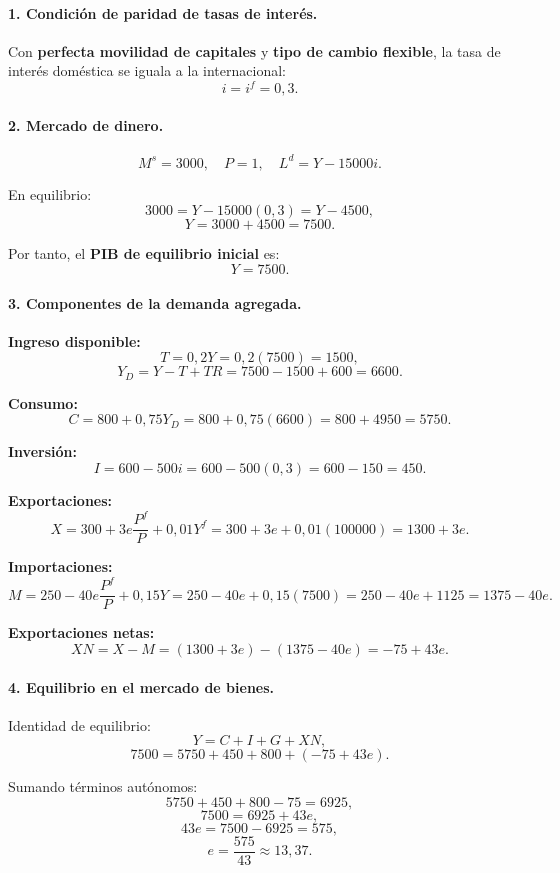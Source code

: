 \documentclass[11pt,addpoints]{article}
\begin{document}
\paragraph{1. Condición de paridad de tasas de interés.}

Con \textbf{perfecta movilidad de capitales} y \textbf{tipo de cambio flexible}, la tasa de interés doméstica se iguala a la internacional:
\[
i = i^f = 0{,}3.
\]

\paragraph{2. Mercado de dinero.}

\[
M^s = 3000, \quad P=1, \quad L^d = Y - 15000i.
\]

En equilibrio:
\[
3000 = Y - 15000(0{,}3) = Y - 4500,
\]
\[
Y = 3000 + 4500 = 7500.
\]

Por tanto, el \textbf{PIB de equilibrio inicial} es:
\[
\boxed{Y = 7500.}
\]

\paragraph{3. Componentes de la demanda agregada.}

\textbf{Ingreso disponible:}
\[
T = 0{,}2Y = 0{,}2(7500) = 1500,
\]
\[
Y_D = Y - T + TR = 7500 - 1500 + 600 = 6600.
\]

\textbf{Consumo:}
\[
C = 800 + 0{,}75Y_D = 800 + 0{,}75(6600) = 800 + 4950 = 5750.
\]

\textbf{Inversión:}
\[
I = 600 - 500i = 600 - 500(0{,}3) = 600 - 150 = 450.
\]

\newpage
\vspace*{0.5cm}
\textbf{Exportaciones:}
\[
X = 300 + 3e\frac{P^f}{P} + 0{,}01Y^f
= 300 + 3e + 0{,}01(100000)
= 1300 + 3e.
\]

\textbf{Importaciones:}
\[
M = 250 - 40e\frac{P^f}{P} + 0{,}15Y
= 250 - 40e + 0{,}15(7500)
= 250 - 40e + 1125
= 1375 - 40e.
\]

\textbf{Exportaciones netas:}
\[
XN = X - M = (1300 + 3e) - (1375 - 40e)
= -75 + 43e.
\]

\paragraph{4. Equilibrio en el mercado de bienes.}

Identidad de equilibrio:
\[
Y = C + I + G + XN,
\]
\[
7500 = 5750 + 450 + 800 + (-75 + 43e).
\]

Sumando términos autónomos:
\[
5750 + 450 + 800 - 75 = 6925,
\]
\[
7500 = 6925 + 43e,
\]
\[
43e = 7500 - 6925 = 575,
\]
\[
e = \frac{575}{43} \approx 13{,}37.
\]
\end{document}
